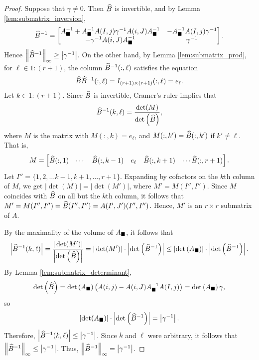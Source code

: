 \documentclass{article}
\begin{document}
\begin{proof}
		Suppose that $\gamma \ne 0$. Then $\widehat{B}$ is invertible, and by Lemma \ref{lem:submatrix_inversion},
		\begin{equation}
			\widehat{B}^{-1} = \left[\begin{matrix}
				A_\blacksquare^{-1} + A_\blacksquare^{-1}A(I,j)\gamma^{-1}A(i,J)A_\blacksquare^{-1} & -A_\blacksquare^{-1}A(I,j)\gamma^{-1} \\
				-\gamma^{-1}A(i,J)A_\blacksquare^{-1} & \gamma^{-1}
			\end{matrix}\right].
		\end{equation}
		Hence $\left\lVert \widehat{B}^{-1} \right\rVert_\infty \ge \left|\gamma^{-1}\right|$. On the other hand, by Lemma \ref{lem:submatrix_prod}, for $\ell \in 1:(r+1)$, the column $\widehat{B}^{-1}(:, \ell)$ satisfies the equation
		\begin{equation}
			\widehat{B}\widehat{B}^{-1}(:,\ell) = I_{(r+1)\times(r+1)}(:,\ell) = e_\ell.
		\end{equation}
		Let $k \in 1:(r+1)$. Since $\widehat{B}$ is invertible, Cramer's ruler implies that
		\begin{equation}
			\widehat{B}^{-1}(k,\ell) = \frac{\det(M)}{\det\left(\widehat{B}\right)},
		\end{equation}
		where $M$ is the matrix with $M(:, k) = e_\ell$, and $M(:, k') = \widehat{B}(:, k')$ if $k' \ne \ell$. That is,
		\begin{equation}
			M = \left[\begin{matrix}
				\widehat{B}(:, 1) & \cdots & \widehat{B}(:,k -1) & e_\ell& \widehat{B}(:,k + 1) & \cdots \widehat{B}(:, r+1)
			\end{matrix}\right].
		\end{equation}
		Let $I'' = \{1,2,\dots k -1, k + 1, \dots, r+1\}$. Expanding by cofactors on the $k$th column of $M$, we get $|\det(M)| = |\det(M')|$, where $M' = M(I'',I'')$. Since $M$ coincides with $\widehat{B}$ on all but the $k$th column, it follows that $M' = M(I'', I'') = \widehat{B}(I'',I'') = A(I',J')(I'', I'')$. Hence, $M'$ is an $r \times r$ submatrix of $A$. 
		
		By the maximality of the volume of $A_\blacksquare$, it follows that
		\begin{equation}
			\left|\widehat{B}^{-1}(k,\ell)\right| = \frac{|\det(M')|}{\left|\det\left(\widehat{B}\right)\right|} =|\det(M')|\cdot \left|\det\left(\widehat{B}^{-1}\right)\right| \le \left|\det\left(A_\blacksquare\right)\right|\cdot \left|\det\left(\widehat{B}^{-1}\right)\right|.
		\end{equation}
		By Lemma \ref{lem:submatrix_determinant},
		\begin{equation}
			\det\left(\widehat{B}\right) = \det\left(A_\blacksquare\right)\left(A(i,j)-A(i,J)A_\blacksquare^{-1}A(I,j)\right) = \det\left(A_\blacksquare\right)\gamma,
		\end{equation}
		so
		\begin{equation}
			\left|\det(A_\blacksquare)\right|\cdot \left|\det\left(\widehat{B}^{-1}\right)\right| = \left|\gamma^{-1}\right|.
		\end{equation}
		Therefore, $\left|\widehat{B}^{-1}(k,\ell)\right| \le \left|\gamma^{-1}\right|$. Since $k$ and $\ell$ were arbitrary, it follows that $\left\lVert \widehat{B}^{-1} \right\rVert_\infty \le \left|\gamma^{-1}\right|$. Thus, $\left\lVert \widehat{B}^{-1} \right\rVert_\infty = \left|\gamma^{-1}\right|$.
		

\end{proof}
\end{document}
